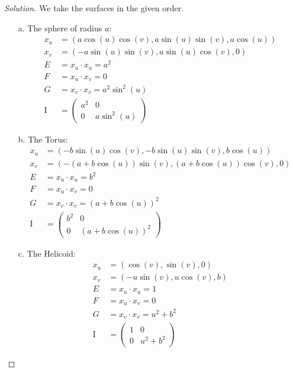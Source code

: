 \documentclass[Shifrin_Solutions_Spring_2018]{subfiles}
\begin{document}
\begin{proof}[Solution] We take the surfaces in the given order.
\begin{itemize}
\item[a.] The sphere of radius $a$:
\begin{align*}
x_u & = \left( a \cos(u)\cos(v) , a \sin(u)\sin(v) , a \cos(u) \right) \\
x_v & = \left( -a \sin(u)\sin(v) , a \sin(u)\cos(v), 0 \right) \\
E & = x_u\cdot x_u = a^2 \\
F & = x_u\cdot x_v = 0 \\
G & = x_v\cdot x_v = a^2\sin^2(u) \\
\mathrm{I} &= \begin{pmatrix} a^2 & 0 \\  0 & a\sin^2(u) \end{pmatrix}
\end{align*}

\item[b.] The Torus:
\begin{align*}
x_u & = \left(-b\sin(u)\cos(v) , -b\sin(u)\sin(v) , b\cos(u) \right) \\
x_v & = \left( -(a+b\cos(u))\sin(v) , (a+b\cos(u))\cos(v) , 0 \right) \\
E & = x_u\cdot x_u = b^2 \\
F & = x_u\cdot x_v =  0 \\
G & = x_v\cdot x_v = \left(a+b\cos(u) \right)^2 \\
\mathrm{I} & = \begin{pmatrix}  b^2 & 0 \\ 0& \left(a+b\cos(u) \right)^2\end{pmatrix}
\end{align*}

\item[c.] The Helicoid:
\begin{align*}
x_u & = \left(\cos(v), \sin(v), 0 \right) \\
x_v & = \left( -u\sin(v) , u\cos(v) , b\right) \\
E & = x_u\cdot x_u = 1 \\
F & = x_u\cdot x_v = 0 \\
G & = x_v\cdot x_v = u^2+b^2 \\
\mathrm{I} &= \begin{pmatrix} 1 & 0 \\ 0 &  u^2+b^2 \end{pmatrix}
\end{align*}


\end{itemize}
\end{proof}
\end{document}
